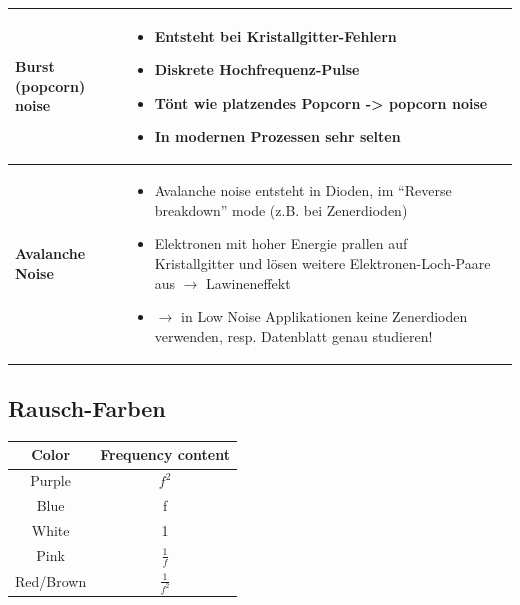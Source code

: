 \begin{longtable}{|>{\bfseries}p{3.5cm}|p{6cm}|p{8cm}|}
\begin{minipage}{4cm}
\textbf{Burst (popcorn) noise}
\end{minipage}
&
\begin{minipage}{6cm}
\begin{itemize}
  \item Entsteht bei Kristallgitter-Fehlern
  \item Diskrete Hochfrequenz-Pulse
  \item Tönt wie platzendes Popcorn -> popcorn noise
  \item In modernen Prozessen sehr selten
\end{itemize}
\end{minipage}
&\\
\hline
\begin{minipage}{4cm}
\textbf{Avalanche Noise}
\end{minipage}
&
\begin{minipage}{6cm}
\begin{itemize}
  \item Avalanche noise entsteht in Dioden, im “Reverse breakdown” mode (z.B.
  bei Zenerdioden)
  \item Elektronen mit hoher Energie prallen auf Kristallgitter und lösen
  weitere Elektronen-Loch-Paare aus $\to$ Lawineneffekt
  \item $\to$ in Low Noise Applikationen keine Zenerdioden verwenden, resp.
  Datenblatt genau studieren!
\end{itemize}
\end{minipage}
&\\
\hline

\end{longtable}

\subsection{Rausch-Farben}
\begin{tabular}{|c|c|}
\hline
\textbf{Color}&\textbf{Frequency content}\\\hline
Purple&$f^2$\\\hline
Blue&f\\\hline
White&1\\\hline
Pink&$\frac{1}{f}$\\\hline
Red/Brown&$\frac{1}{f^2}$\\\hline
\end{tabular}

